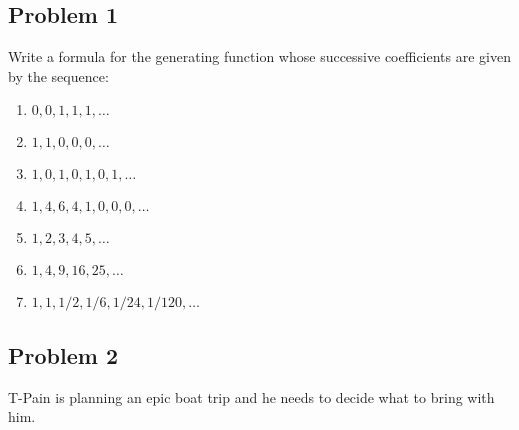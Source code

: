 \documentclass[12pt]{article}
\begin{document}

\subsection*{Problem 1}

Write a formula for the generating function whose successive
coefficients are given by the sequence:


\begin{enumerate}
    \item $0, 0, 1, 1, 1,\dots$

    \item $1, 1, 0, 0, 0,\dots$

    \item $1, 0, 1, 0, 1, 0, 1,\dots$

    \item $1, 4, 6, 4, 1, 0, 0, 0,\dots$

    \item $1, 2, 3, 4, 5,\dots$

    \item $1, 4, 9, 16, 25,\dots$

    \item $1, 1, 1/2, 1/6, 1/24, 1/120,\dots$

    \end{enumerate}



\newpage
\subsection*{Problem 2}


T-Pain is planning an epic boat trip and he needs to decide what to
bring with him.
\end{document}
